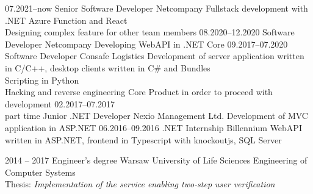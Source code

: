 \documentclass[9pt]{developercv} %
\begin{document}
\begin{entrylist}
	\entry
		{07.2021--now}
		{Senior Software Developer}
		{Netcompany}
		{
		  Fullstack development with .NET Azure Function and React\\
		  Designing complex feature for other team members
		}
	\entry
		{08.2020--12.2020}
		{Software Developer}
		{Netcompany}
		{
		  Developing WebAPI in .NET Core
		}
	\entry
		{09.2017--07.2020}
		{Software Developer}
		{Consafe Logistics}
		{
		  Development of server application written in C/C++, desktop clients written in C\# and Bundles\\
		  Scripting in Python\\
		  Hacking and reverse engineering Core Product in order to proceed with development
		}
	\entry
		{02.2017--07.2017\\\footnotesize{part time}}
		{Junior .NET Developer}
		{Nexio Management Ltd.}
		{
		  Development of MVC application in ASP.NET
		}
	\entry
		{06.2016--09.2016}
		{.NET Internship}
		{Billennium}
		{
		  WebAPI written in ASP.NET, frontend in Typescript with knockoutjs, SQL Server
		}

\end{entrylist}



\begin{entrylist}
	\entry
		{2014 -- 2017}
		{Engineer’s degree}
		{Warsaw University of Life Sciences}
		{
			Engineering of Computer Systems\\
			Thesis: \it{Implementation of the service enabling two-step user verification}
		}
\end{entrylist}

\end{document}

